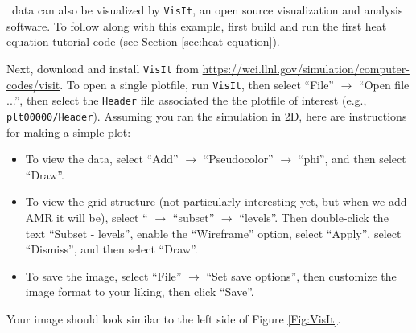 \section{\visit}
\label{sec:visit}

\amrex\ data can also be visualized by {\tt VisIt}, an open
source visualization and analysis software.  To follow along with this example,
first build and run the first heat equation tutorial code
(see Section \ref{sec:heat equation}).

Next, download and install {\tt VisIt} from \url{https://wci.llnl.gov/simulation/computer-codes/visit}.
To open a single plotfile, run {\tt VisIt}, then select ``File'' $\rightarrow$ ``Open file ...'',
then select the {\tt Header} file associated the the plotfile of interest (e.g., {\tt plt00000/Header}).
Assuming you ran the simulation in 2D, here are instructions for making a simple plot:
\begin{itemize}
\item To view the data, select ``Add'' $\rightarrow$ ``Pseudocolor'' $\rightarrow$ ``phi'', and then select
``Draw''.
\item To view the grid structure (not particularly interesting yet, but when we add AMR it will be), select
`` $\rightarrow$ ``subset'' $\rightarrow$ ``levels''.  Then double-click the text ``Subset - levels'',
enable the ``Wireframe'' option, select ``Apply'', select ``Dismiss'', and then select ``Draw''.
\item To save the image, select ``File'' $\rightarrow$ ``Set save options'', then customize the image format
to your liking, then click ``Save''.
\end{itemize}
Your image should look similar to the left side of Figure \ref{Fig:VisIt}.\\
